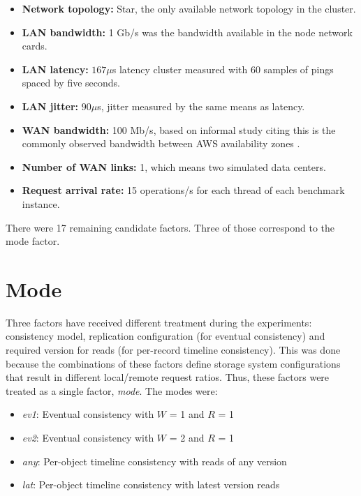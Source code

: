 \documentclass[doublespacing]{bmcart}
\begin{document}
\begin{itemize}
\item \textbf{Network topology:} Star, the only available network topology in
the cluster.

\item \textbf{LAN bandwidth:} 1 Gb/s was the bandwidth available in the node
network cards.

\item \textbf{LAN latency:} $167\mu$s latency cluster measured with 60 samples
of pings spaced by five seconds.

\item \textbf{LAN jitter:} $90\mu$s, jitter measured by the same means as
latency.

\item \textbf{WAN bandwidth:} 100 Mb/s, based on informal study citing this is
the commonly observed  bandwidth between AWS availability zones
\cite{Pujol2012}.

\item \textbf{Number of WAN links:} 1, which means two simulated data centers.

\item \textbf{Request arrival rate:} 15 operations/s for each thread of each
benchmark instance.

\end{itemize}

There were 17 remaining candidate factors. Three of those correspond to the mode
factor.

\section{Mode}

Three factors have received different treatment during the experiments: consistency
model, replication configuration (for eventual consistency) and required version for reads (for per-record timeline consistency). This was done because the combinations of
these factors define storage system configurations that result in different
local/remote request ratios. Thus, these factors were treated as a single factor,
\textit{mode}. The modes were:

\begin{itemize}

\item \textit{ev1}: Eventual consistency with $W$ = 1 and $R$ = 1

\item \textit{ev2}: Eventual consistency with $W$ = 2 and $R$ = 1

\item \textit{any}: Per-object timeline consistency with reads of any version

\item \textit{lat}: Per-object timeline consistency with latest version reads

\end{itemize}
\end{document}
